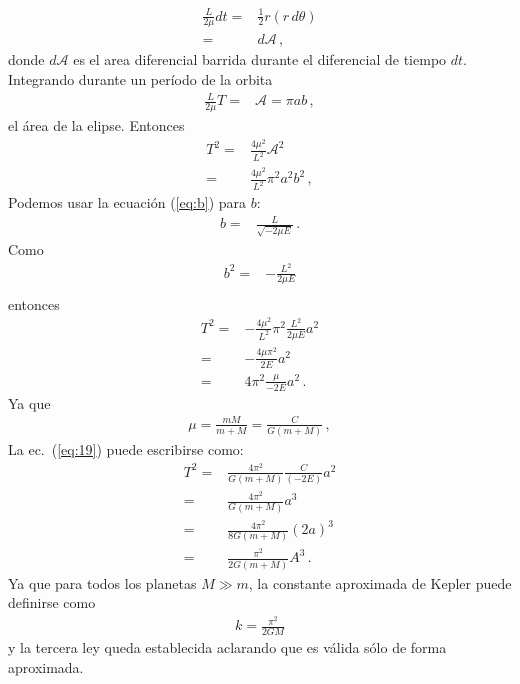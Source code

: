 \begin{align}
  \frac{L}{2\mu}dt =&\frac{1}{2}r (r\,d\theta)\nonumber\\
=&d\mathcal{A}\,,
\end{align}
donde $d\mathcal{A}$ es el area diferencial barrida durante el diferencial de tiempo $dt$. Integrando durante un período de la orbita
\begin{align}
  \frac{L}{2\mu} T=&\mathcal{A}=\pi a b\,,
\end{align}
el área de la elipse. Entonces
\begin{align}
  T^2=&\frac{4\mu^2}{L^2}\mathcal{A}^2\nonumber\\
  =&\frac{4\mu^2}{L^2}\pi^2 a^2 b^2\,,
\end{align}
Podemos usar la  ecuación (\ref{eq:b}) para $b$:
\begin{align*}
  b=&\frac{L}{\sqrt{-2\mu E}}\,.
\end{align*}
Como
\begin{align}
  b^2=&-\frac{L^2}{2\mu E}\nonumber\\
\end{align}
entonces
\begin{align}
  \label{eq:19}
T^2=&-\frac{4\mu^2}{L^2}\pi^2\frac{L^2}{2\mu E} a^2 \nonumber\\
=&-\frac{4\mu\pi^2}{2E} a^2 \nonumber\\
=&4\pi^2\frac{\mu}{-2E} a^2 \,.
\end{align}
Ya que
\begin{align}
  \mu=\frac{mM}{m+M}=\frac{C}{G(m+M)}\,,
\end{align}
La ec.~(\ref{eq:19}) puede escribirse como:
\begin{align}
  T^2=&\frac{4\pi^2}{G(m+M)}\frac{C}{(-2E)} a^2 \nonumber\\
=&\frac{4\pi^2}{G(m+M)}a^3 \nonumber\\
=&\frac{4\pi^2}{8G(m+M)}(2a)^3 \nonumber\\
=&\frac{\pi^2}{2G(m+M)}A^3 \,.
\end{align}
Ya que para todos los planetas $M\gg m$, la constante aproximada de Kepler puede definirse como
\begin{align}
  k=\frac{\pi^2}{2GM}
\end{align}
y la tercera ley queda establecida aclarando que es válida sólo de forma aproximada.



